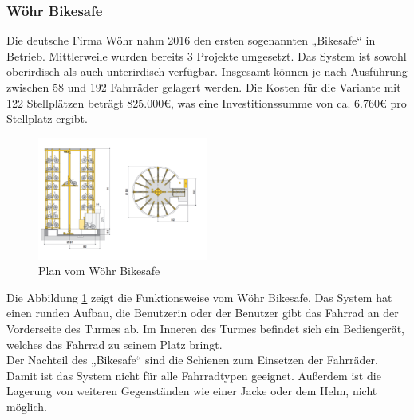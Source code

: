 \subsubsection{Wöhr Bikesafe}
Die deutsche Firma Wöhr nahm 2016 den ersten sogenannten „Bikesafe“ in Betrieb.  Mittlerweile wurden bereits 3 Projekte umgesetzt.  Das System ist sowohl oberirdisch als auch unterirdisch verfügbar. Insgesamt können je nach Ausführung zwischen 58 und 192 Fahrräder gelagert werden. Die Kosten für die Variante mit 122 Stellplätzen beträgt 825.000€, was eine Investitionssumme von ca. 6.760€ pro Stellplatz ergibt.\cite*{richtpreisangebot} \\

\begin{figure}[H]
    \centering
    \includegraphics[width=0.5\textwidth]{images/bikesafe.png}
    \caption{Plan vom Wöhr Bikesafe }
    \label{fig:bikesafe}
\end{figure}

Die Abbildung \ref{fig:bikesafe} zeigt die Funktionsweise vom Wöhr Bikesafe. Das System hat einen runden Aufbau, die Benutzerin oder der Benutzer gibt das Fahrrad an der Vorderseite des Turmes ab. Im Inneren des Turmes befindet sich ein Bediengerät, welches das Fahrrad zu seinem Platz bringt.\\
Der Nachteil des „Bikesafe“ sind die Schienen zum Einsetzen der Fahrräder. Damit ist das System nicht für alle Fahrradtypen geeignet. Außerdem ist die Lagerung von weiteren Gegenständen wie einer Jacke oder dem Helm, nicht möglich.\\

